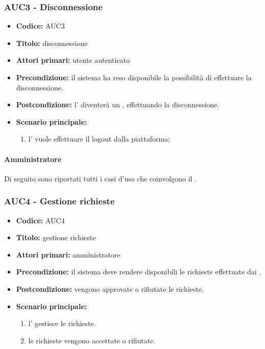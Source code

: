 \documentclass[casi-duso]{subfiles}
\begin{document}
\subsubsection{AUC3 - Disconnessione}%
\label{subsub:AUC3}
\begin{itemize}
  \item \textbf{Codice:} AUC3
  \item \textbf{Titolo:} disconnessione
  \item \textbf{Attori primari:} utente autenticato
  \item \textbf{Precondizione:} il sistema ha reso disponibile la possibilità di effettuare la disconnessione.
  \item \textbf{Postcondizione:} l' diventerà un , effettuando la disconnessione.
  \item \textbf{Scenario principale:} 
  \begin{enumerate}
    \item l' vuole effettuare il logout dalla piattaforma;
  \end{enumerate}
\end{itemize}

\paragraph{Amministratore}%
\label{par:amministratore}
Di seguito sono riportati tutti i casi d'uso che coinvolgono il  .



\subsubsection{AUC4 - Gestione richieste}%
\label{subsub:AUC4}
\begin{itemize}
  \item \textbf{Codice:} AUC4
  \item \textbf{Titolo:} gestione richieste
  \item \textbf{Attori primari:} amministratore
  \item \textbf{Precondizione:} il sistema deve rendere disponibili le richieste effettuate dai .
  \item \textbf{Postcondizione:} vengono approvate o rifiutate le richieste.
  \item \textbf{Scenario principale:} 
  \begin{enumerate}
    \item l' gestisce le richieste.
    \item le richieste vengono accettate o rifiutate.
  \end{enumerate}
\end{itemize}
\end{document}
